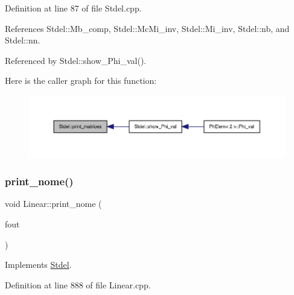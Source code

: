 Definition at line 87 of file Stdel.\+cpp.



References Stdel\+::\+Mb\+\_\+comp, Stdel\+::\+Mc\+Mi\+\_\+inv, Stdel\+::\+Mi\+\_\+inv, Stdel\+::nb, and Stdel\+::nn.



Referenced by Stdel\+::show\+\_\+\+Phi\+\_\+val().

Here is the caller graph for this function\+:
\nopagebreak
\begin{figure}[H]
\begin{center}
\leavevmode
\includegraphics[width=350pt]{classStdel_a319e6a16011b22e12028a841b7686f03_icgraph}
\end{center}
\end{figure}
\mbox{\label{classLinear_a595913d994d6a49d3fe435252d56fceb}} 
\subsubsection{\texorpdfstring{print\+\_\+nome()}{print\_nome()}}
{\footnotesize\ttfamily void Linear\+::print\+\_\+nome (\begin{DoxyParamCaption}\item[{F\+I\+LE $\ast$}]{fout }\end{DoxyParamCaption})\hspace{0.3cm}{\ttfamily [virtual]}}



Implements \hyperlink{classStdel_ac654f45f744ec4cfeab74ed4ded99ef5}{Stdel}.



Definition at line 888 of file Linear.\+cpp.

\mbox{\label{classLinear_ac9e8aae8711e4cbce11a4f685017b1d3}} 
